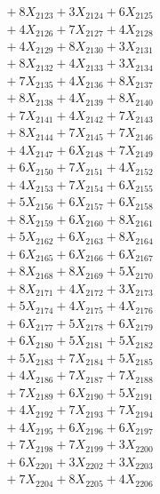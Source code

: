 \documentclass[a4paper,10pt]{article}
\begin{document}
{\begin{align}
&\;  + 8 X_{2123} + 3 X_{2124} + 6 X_{2125} \\[0.3ex]
&\;  + 4 X_{2126} + 7 X_{2127} + 4 X_{2128} \\[0.3ex]
&\;  + 4 X_{2129} + 8 X_{2130} + 3 X_{2131} \\[0.3ex]
&\;  + 8 X_{2132} + 4 X_{2133} + 3 X_{2134} \\[0.3ex]
&\;  + 7 X_{2135} + 4 X_{2136} + 8 X_{2137} \\[0.3ex]
&\;  + 8 X_{2138} + 4 X_{2139} + 8 X_{2140} \\[0.5ex]\allowbreak
&\;  + 7 X_{2141} + 4 X_{2142} + 7 X_{2143} \\[0.3ex]
&\;  + 8 X_{2144} + 7 X_{2145} + 7 X_{2146} \\[0.3ex]
&\;  + 4 X_{2147} + 6 X_{2148} + 7 X_{2149} \\[0.3ex]
&\;  + 6 X_{2150} + 7 X_{2151} + 4 X_{2152} \\[0.3ex]
&\;  + 4 X_{2153} + 7 X_{2154} + 6 X_{2155} \\[0.3ex]
&\;  + 5 X_{2156} + 6 X_{2157} + 6 X_{2158} \\[0.3ex]
&\;  + 8 X_{2159} + 6 X_{2160} + 8 X_{2161} \\[0.3ex]
&\;  + 5 X_{2162} + 6 X_{2163} + 8 X_{2164} \\[0.3ex]
&\;  + 6 X_{2165} + 6 X_{2166} + 6 X_{2167} \\[0.3ex]
&\;  + 8 X_{2168} + 8 X_{2169} + 5 X_{2170} \\[0.5ex]\allowbreak
&\;  + 8 X_{2171} + 4 X_{2172} + 3 X_{2173} \\[0.3ex]
&\;  + 5 X_{2174} + 4 X_{2175} + 4 X_{2176} \\[0.3ex]
&\;  + 6 X_{2177} + 5 X_{2178} + 6 X_{2179} \\[0.3ex]
&\;  + 6 X_{2180} + 5 X_{2181} + 5 X_{2182} \\[0.3ex]
&\;  + 5 X_{2183} + 7 X_{2184} + 5 X_{2185} \\[0.3ex]
&\;  + 4 X_{2186} + 7 X_{2187} + 7 X_{2188} \\[0.3ex]
&\;  + 7 X_{2189} + 6 X_{2190} + 5 X_{2191} \\[0.3ex]
&\;  + 4 X_{2192} + 7 X_{2193} + 7 X_{2194} \\[0.3ex]
&\;  + 4 X_{2195} + 6 X_{2196} + 6 X_{2197} \\[0.3ex]
&\;  + 7 X_{2198} + 7 X_{2199} + 3 X_{2200} \\[0.5ex]\allowbreak
&\;  + 6 X_{2201} + 3 X_{2202} + 3 X_{2203} \\[0.3ex]
&\;  + 7 X_{2204} + 8 X_{2205} + 4 X_{2206} \\[0.3ex]

\end{align}}
\end{document}
